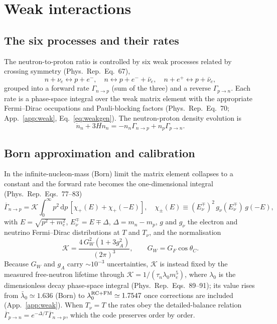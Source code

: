 \documentclass[11pt,a4paper]{article}
\newcommand{\dd}{\mathrm{d}}
\newcommand{\Tnu}{T_\nu}
\newcommand{\PR}{Phys.\ Rep.}
\newcommand{\Gap}{\Delta}
\newcommand{\Kw}{\mathcal{K}}
\begin{document}
\section{Weak interactions}\label{sec:weak}

\subsection{The six processes and their rates}
The neutron-to-proton ratio is controlled by six weak processes related by
crossing symmetry (\PR\ Eq.~67),
\begin{equation}
  n+\nu_e \leftrightarrow p+e^-, \quad
  n \leftrightarrow p+e^-+\bar\nu_e, \quad
  n+e^+ \leftrightarrow p+\bar\nu_e,
\label{eq:sixprocesses}
\end{equation}
grouped into a forward rate $\Gamma_{n\to p}$ (sum of the three) and a reverse
$\Gamma_{p\to n}$. Each rate is a phase-space integral over the weak matrix
element with the appropriate Fermi--Dirac occupations and Pauli-blocking factors
(\PR\ Eq.~70; App.~\ref{app:weak}, Eq.~\eqref{eq:weakgen}). The neutron-proton
density evolution is
\begin{equation}
  \dot n_n + 3Hn_n = -n_n\Gamma_{n\to p} + n_p\Gamma_{p\to n}.
\end{equation}

\subsection{Born approximation and calibration}
In the infinite-nucleon-mass (Born) limit the matrix element collapses to a
constant and the forward rate becomes the one-dimensional integral (\PR\
Eqs.~77--83)
\begin{equation}
  \overline\Gamma_{n\to p} = \Kw\!\int_0^\infty\! p^2\,\dd p\,
     \left[\chi_+(E)+\chi_+(-E)\right],
  \quad
  \chi_\pm(E)\equiv (E_\nu^\mp)^2\,g_\nu(E_\nu^\mp)\,g(-E),
\label{eq:born}
\end{equation}
with $E=\sqrt{p^2+m_e^2}$, $E_\nu^\mp=E\mp\Gap$, $\Gap=m_n-m_p$, $g$ and $g_\nu$
the electron and neutrino Fermi--Dirac distributions at $T$ and $\Tnu$, and the
normalisation
\begin{equation}
  \Kw = \frac{4\,G_W^2(1+3g_A^2)}{(2\pi)^3}, \qquad G_W = G_F\cos\theta_C .
\label{eq:K}
\end{equation}
Because $G_W$ and $g_A$ carry $\sim\!10^{-3}$ uncertainties, $\Kw$ is instead
fixed by the measured free-neutron lifetime through $\Kw=1/(\tau_n\lambda_0
m_e^5)$, where $\lambda_0$ is the dimensionless decay phase-space integral (\PR\
Eqs.~89--91); its value rises from $\bar\lambda_0\simeq1.636$ (Born) to
$\lambda_0^{\rm RC+FM}\simeq1.7547$ once corrections are included
(App.~\ref{app:weak}). When $\Tnu=T$ the rates obey the detailed-balance
relation $\overline\Gamma_{p\to n}=e^{-\Gap/T}\overline\Gamma_{n\to p}$, which
the code preserves order by order.
\end{document}
